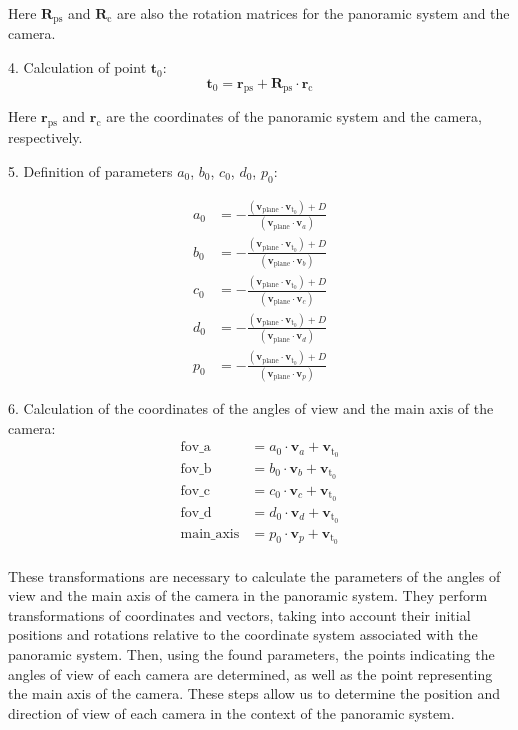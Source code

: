 Here $ \mathbf{R}_\text{ps} $ and $ \mathbf{R}_\text{c} $ are also the rotation matrices for the panoramic system and the camera.

4. Calculation of point $ \mathbf{t}_0 $:
$$
\mathbf{t}_0 = \mathbf{r}_\text{ps} + \mathbf{R}_\text{ps} \cdot \mathbf{r}_\text{c}
$$

Here $ \mathbf{r}_\text{ps} $ and $ \mathbf{r}_\text{c} $ are the coordinates of the panoramic system and the camera, respectively.

5. Definition of parameters $a_0$, $b_0$, $c_0$, $d_0$, $p_0$:

\begin{align*}
a_0 &= -\frac{\left(\mathbf{v}_\text{plane} \cdot \mathbf{v}_{\text{t}_0}\right) + D} {\left(\mathbf{v}_\text{plane} \cdot \mathbf{v}_a\right)} \\
b_0 &= -\frac{\left(\mathbf{v}_\text{plane} \cdot \mathbf{v}_{\text{t}_0}\right) + D} {\left(\mathbf{v}_\text{plane} \cdot \mathbf{v}_b\right)} \\
c_0 &= -\frac{\left(\mathbf{v}_\text{plane} \cdot \mathbf{v}_{\text{t}_0}\right) + D}{\left(\mathbf{v}_\text{plane} \cdot \mathbf{v}_c\right)} \\
d_0 &= -\frac{\left(\mathbf{v}_\text{plane} \cdot \mathbf{v}_{\text{t}_0}\right) + D}{\left(\mathbf{v}_\text{plane} \cdot \mathbf{v}_d\right)} \\
p_0 &= -\frac{\left(\mathbf{v}_\text{plane} \cdot \mathbf{v}_{\text{t}_0}\right) + D}{\left(\mathbf{v}_\text{plane} \cdot \mathbf{v}_p\right)}
\end{align*}

6. Calculation of the coordinates of the angles of view and the main axis of the camera:
\begin{align*}
\text{fov\_a} &= a_0 \cdot \mathbf{v}_a + \mathbf{v}_{\text{t}_0} \\
\text{fov\_b} &= b_0 \cdot \mathbf{v}_b + \mathbf{v}_{\text{t}_0} \\ 
\text{fov\_c} &= c_0 \cdot \mathbf{v}_c + \mathbf{v}_{\text{t}_0} \\ 
\text{fov\_d} &= d_0 \cdot \mathbf{v}_d + \mathbf{v}_{\text{t}_0} \\ 
\text{main\_axis} &= p_0 \cdot \mathbf{v}_p + \mathbf{v}_{\text{t}_0} \\
\end{align*}

These transformations are necessary to calculate the parameters of the angles of view and the main axis of the camera in the panoramic system. They perform transformations of coordinates and vectors, taking into account their initial positions and rotations relative to the coordinate system associated with the panoramic system. Then, using the found parameters, the points indicating the angles of view of each camera are determined, as well as the point representing the main axis of the camera. These steps allow us to determine the position and direction of view of each camera in the context of the panoramic system.



